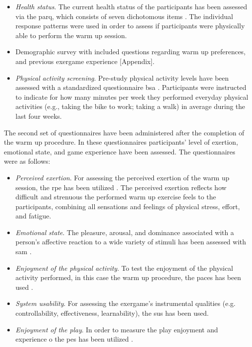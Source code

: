 \begin{itemize}
\item \textit{Health status}. The current health status of the participants has been assessed via the \gls{parq}, which consists of seven dichotomous items \cite{thomas1992revision}. The individual response patterns were used in order to assess if participants were physically able to perform the warm up session.
\item Demographic survey with included questions regarding warm up preferences, and previous exergame experience [Appendix].
\item \textit{Physical activity screening}. Pre-study physical activity levels have been assessed with a standardized questionnaire  \gls{bsa} \cite{fuchs2015messung}. Participants were instructed to indicate for how many minutes per week they performed everyday physical activities (e.g., taking the bike to work; taking a walk) in average during the last four weeks. 
\end{itemize}
The second set of questionnaires have been administered after the completion of the warm up procedure. In these questionnaires participants' level of exertion, emotional state, and game experience have been assessed. The questionnaires were as follows:
\begin{itemize}
\item \textit{Perceived exertion}. For assessing the perceived exertion of the warm up session, the \gls{rpe} has been utilized \cite{borg1998borg}. The perceived exertion reflects how difficult and strenuous the performed warm up exercise feels to the participants, combining all sensations and feelings of physical stress, effort, and fatigue.
\item \textit{Emotional state}. The pleasure, arousal, and dominance associated with a person's affective reaction to a wide variety of stimuli has been assessed with \gls{sam} \cite{bradley1994measuring}. 
\item \textit{Enjoyment of the physical activity}. To test the enjoyment of the physical activity performed, in this case the warm up procedure, the \gls{paces} has been used \cite{kendzierski1991physical}. 
\item \textit{System usability}. For assessing the exergame's instrumental qualities (e.g. controllability, effectiveness, learnability), the \gls{sus} has been used.
\item \textit{Enjoyment of the play}. In order to measure the play enjoyment and experience o the \gls{pes} has been utilized \cite{pavlas2012play}. 
\end{itemize}
